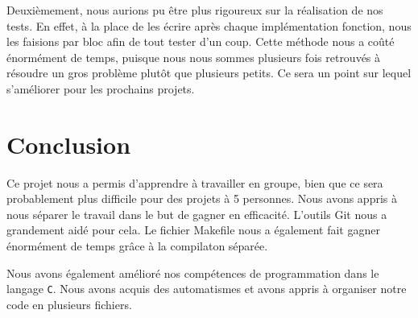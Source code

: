 \documentclass[a4paper]{article}
\begin{document}
Deuxièmement, nous aurions pu être plus rigoureux sur la réalisation de nos tests. En effet, à la place de les écrire après chaque implémentation fonction, nous les faisions par bloc afin de tout tester d'un coup. Cette méthode nous a coûté énormément de temps, puisque nous nous sommes plusieurs fois retrouvés à résoudre un gros problème plutôt que plusieurs petits. Ce sera un point sur lequel s'améliorer pour les prochains projets.

\section{Conclusion}

Ce projet nous a permis d'apprendre à travailler en groupe, bien que ce sera probablement plus difficile pour des projets à 5 personnes. Nous avons appris à nous séparer le travail dans le but de gagner en efficacité. L'outils Git nous a grandement aidé pour cela. Le fichier Makefile nous a également fait gagner énormément de temps grâce à la compilaton séparée.

Nous avons également amélioré nos compétences de programmation dans le langage \verb|C|. Nous avons acquis des automatismes et avons appris à organiser notre code en plusieurs fichiers.

\end{document}

